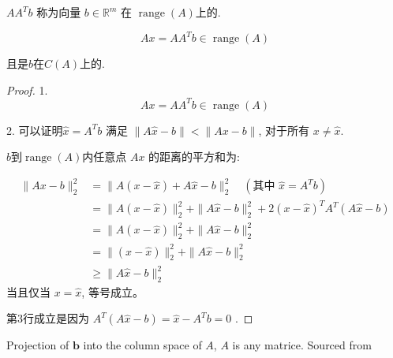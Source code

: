 $ A A^{T} b $ 称为向量 $  {b} \in \mathbb{R}^{m} $ 在 $ \operatorname{range} (A)$上的.

\begin{theorem}
    \begin{equation} A x=A A^{T} b \in \operatorname{range}(A) \end{equation}

    且是$b$在$C(A)$上的.
\end{theorem}

\begin{proof}
    1.
    \begin{equation} A x=A A^{T} b \in \operatorname{range}(A) \end{equation}

    2. 可以证明$ \hat{x}=A^{T} b $ 满足 $ \|A \hat{x}-b\|<\|A x-b\| $, 对于所有 $ x \neq \hat{x} $.

    $b$到$\operatorname{range}(A)$内任意点 $ A x $ 的距离的平方和为:

    \begin{equation} \begin{aligned}\|A x-b\|_{2}^{2} &=\|A(x-\hat{x})+A \hat{x}-b\|_{2}^{2} \quad\left(\text {其中 } \hat{x}=A^{T} b\right) \\ &=\|A(x-\hat{x})\|_{2}^{2}+\|A \hat{x}-b\|_{2}^{2}+2(x-\hat{x})^{T} A^{T}(A \hat{x}-b) \\ &=\|A(x-\hat{x})\|_{2}^{2}+\|A \hat{x}-b\|_{2}^{2} \\ &=\|(x-\hat{x})\|_{2}^{2}+\|A \hat{x}-b\|_{2}^{2} \\ & \geq\|A \hat{x}-b\|_{2}^{2} \end{aligned} \end{equation}
当且仅当 $ x=\hat{x} $, 等号成立。

第3行成立是因为 $ A^{T}(A \hat{x}-b)=\hat{x}-A^{T} b=0 $ .
\end{proof}

\begin{FigureCenter}{Projection of $\boldsymbol{b}$ into the column space of ${A}$, $A$ is any matrice. Sourced from \cite{Strang1993IntroductionTL}}
    
\end{FigureCenter}


    
